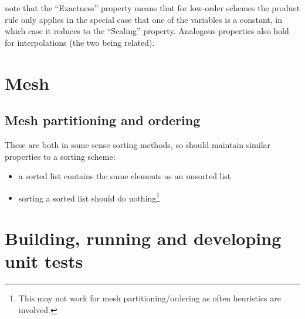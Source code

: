 \documentclass[11pt]{article}
\begin{document}
\begin{table}[h]
\end{table}

note that the ``Exactness'' property means that for low-order schemes the product rule only applies
in the special case that one of the variables is a constant, in which case it reduces to the
``Scaling'' property.
Analogous properties also hold for interpolations (the two being related).

\section{Mesh}

\subsection{Mesh partitioning and ordering}

These are both in some sense sorting methods, so should maintain similar properties to a sorting
scheme:
\begin{itemize}
\item a sorted list contains the same elements as an unsorted list
\item sorting a sorted list should do nothing\footnote{This may not work for mesh
    partitioning/ordering as often heuristics are involved.}
\end{itemize}

\section{Building, running and developing unit tests}
\label{sec:build-runn-unit}
\end{document}
